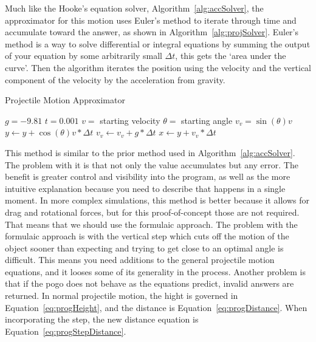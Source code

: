\documentclass[12pt, letterpaper]{article}
\newcommand{\sorta}[1]{`#1'}
\newcommand{\poses}[1]{#1's}
\begin{document}
Much like the \poses{Hooke} equation solver, Algorithm~\ref{alg:accSolver}, the approximator for this motion
uses \poses{Euler} method to iterate through time and accumulate toward the answer, as shown in
Algorithm~\ref{alg:projSolver}. \poses{Euler} method is a way to solve differential or integral equations by
summing the output of your equation by some arbitrarily small $\Delta t$, this gets the \sorta{area under
the curve}. Then the algorithm iterates the position using the velocity and the vertical component of the 
velocity by the acceleration from gravity.

\begin{algorithm}
\caption{Projectile Motion Approximator}
\begin{algorithmic} 
\label{alg:projSolver}
\REQUIRE $g = -9.81$
\REQUIRE $t = 0.001$
\REQUIRE $v =$ starting velocity
\REQUIRE $\theta =$ starting angle
\REQUIRE $v_v = \sin(\theta) v$
\STATE $y \leftarrow  y + \cos(\theta) v * \Delta t$
\STATE $v_v \leftarrow  v_v + g * \Delta t$
\STATE $x \leftarrow  y + v_v * \Delta t$
\ENDWHILE
\end{algorithmic}
\end{algorithm}

This method is similar to the prior method used in Algorithm~\ref{alg:accSolver}. The problem with it is that
not only the value accumulates but any error. The benefit is greater control and visibility into
the program, as well as the more intuitive explanation because you need to describe that happens in a single
moment. In more complex simulations, this method is better because it allows for drag and rotational forces,
but for this proof-of-concept those are not required. That means that we should use the formulaic approach.
The problem with the formulaic approach is with the vertical step which cuts off the motion of the object
sooner than expecting and trying to get close to an optimal angle is difficult. This means you need additions
to the general projectile motion equations, and it looses some of its generality in the process. Another
problem is that if the pogo does not behave as the equations predict, invalid answers are returned. In normal
projectile motion, the hight is governed in Equation~\ref{eq:progHeight}, and the distance is 
Equation~\ref{eq:progDistance}. When incorporating the step, the new distance equation is 
Equation~\ref{eq:progStepDistance}.
\end{document}
